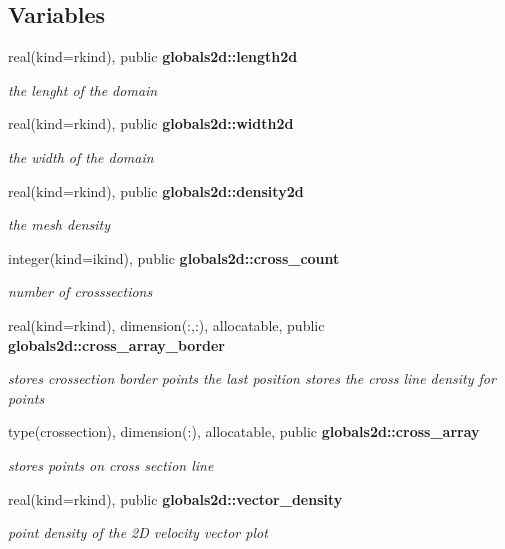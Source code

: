 \subsection*{Variables}
\begin{DoxyCompactItemize}
\item 
real(kind=rkind), public {\bf globals2d\+::length2d}
\begin{DoxyCompactList}\small\item\em the lenght of the domain \end{DoxyCompactList}\item 
real(kind=rkind), public {\bf globals2d\+::width2d}
\begin{DoxyCompactList}\small\item\em the width of the domain \end{DoxyCompactList}\item 
real(kind=rkind), public {\bf globals2d\+::density2d}
\begin{DoxyCompactList}\small\item\em the mesh density \end{DoxyCompactList}\item 
integer(kind=ikind), public {\bf globals2d\+::cross\+\_\+count}
\begin{DoxyCompactList}\small\item\em number of crosssections \end{DoxyCompactList}\item 
real(kind=rkind), dimension(\+:,\+:), allocatable, public {\bf globals2d\+::cross\+\_\+array\+\_\+border}
\begin{DoxyCompactList}\small\item\em stores crossection border points the last position stores the cross line density for points \end{DoxyCompactList}\item 
type(crossection), dimension(\+:), allocatable, public {\bf globals2d\+::cross\+\_\+array}
\begin{DoxyCompactList}\small\item\em stores points on cross section line \end{DoxyCompactList}\item 
real(kind=rkind), public {\bf globals2d\+::vector\+\_\+density}
\begin{DoxyCompactList}\small\item\em point density of the 2D velocity vector plot \end{DoxyCompactList}\end{DoxyCompactItemize}
